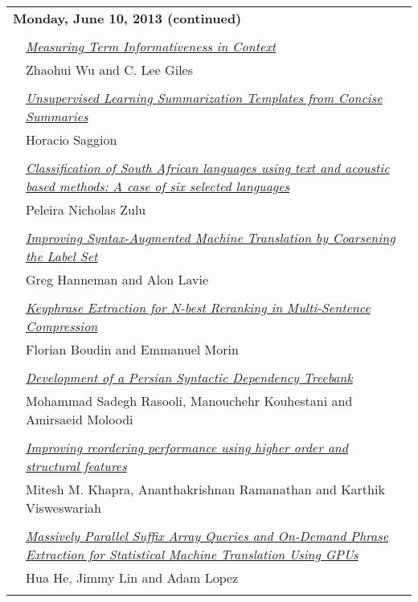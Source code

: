 \begin{tabular}{p{20mm}p{138mm}}
\\
\multicolumn{2}{l}{\bf Monday, June 10, 2013
 (continued)} \\\\
 & \hyperlink{page.259}{\em Measuring Term Informativeness in Context}\\
         & Zhaohui Wu and C. Lee Giles \\
\\

 & \hyperlink{page.270}{\em Unsupervised Learning Summarization Templates from Concise Summaries}\\
         & Horacio Saggion \\
\\

 & \hyperlink{page.280}{\em Classification of South African languages using text and acoustic based methods: A case of six selected languages}\\
         & Peleira Nicholas Zulu \\
\\

 & \hyperlink{page.288}{\em Improving Syntax-Augmented Machine Translation by Coarsening the Label Set}\\
         & Greg Hanneman and Alon Lavie \\
\\

 & \hyperlink{page.298}{\em Keyphrase Extraction for N-best Reranking in Multi-Sentence Compression}\\
         & Florian Boudin and Emmanuel Morin \\
\\

 & \hyperlink{page.306}{\em Development of a Persian Syntactic Dependency Treebank}\\
         & Mohammad Sadegh Rasooli, Manouchehr Kouhestani and Amirsaeid Moloodi \\
\\

 & \hyperlink{page.315}{\em Improving reordering performance using higher order and structural features}\\
         & Mitesh M. Khapra, Ananthakrishnan Ramanathan and Karthik Visweswariah \\
\\

 & \hyperlink{page.325}{\em Massively Parallel Suffix Array Queries and On-Demand Phrase Extraction for Statistical Machine Translation Using GPUs}\\
         & Hua He, Jimmy Lin and Adam Lopez \\
\\


\end{tabular}
